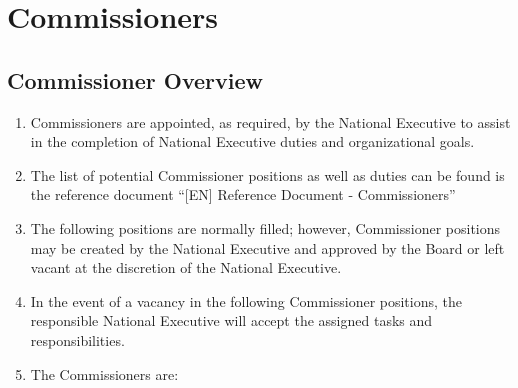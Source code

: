 \section{Commissioners}
\label{commissioners}

\subsection{Commissioner Overview}
\label{commissioner-overview}

\begin{enumerate}
 \item
  Commissioners are appointed, as required, by the National Executive to assist in the completion of National Executive duties and organizational goals.
 \item
  The list of potential Commissioner positions as well as duties can be found is the reference document “{[}EN{]} Reference Document - Commissioners”
 \item
  The following positions are normally filled; however, Commissioner positions may be created by the National Executive and approved by the Board or left vacant at the discretion of the National Executive.
 \item
  In the event of a vacancy in the following Commissioner positions, the responsible National Executive will accept the assigned tasks and responsibilities.
 \item
  The Commissioners are:


\end{enumerate}
